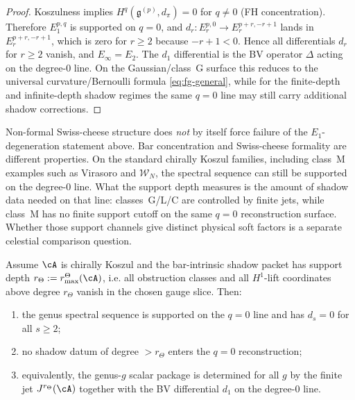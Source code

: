 \begin{proof}
Koszulness implies $H^q(\mathfrak{g}^{(p)}, d_\pi) = 0$ for $q \neq 0$
(FH concentration). Therefore $E_1^{p,q}$ is supported on $q = 0$, and
$d_r: E_r^{p,0} \to E_r^{p+r,-r+1}$ lands in $E_r^{p+r, -r+1}$, which is zero
for $r \geq 2$ because $-r + 1 < 0$. Hence all differentials $d_r$ for $r \geq 2$
vanish, and $E_\infty = E_2$. The $d_1$ differential is the BV operator $\Delta$
acting on the degree-$0$ line. On the Gaussian/class~G surface this reduces to
the universal curvature/Bernoulli formula \eqref{eq:fg-general}, while for the
finite-depth and infinite-depth shadow regimes the same $q=0$ line may still carry
additional shadow corrections.
\end{proof}

\begin{remark}
Non-formal Swiss-cheese structure does \emph{not} by itself force failure of
the $E_1$-degeneration statement above. Bar concentration and Swiss-cheese
formality are different properties. On the standard chirally Koszul families,
including class~M examples such as Virasoro and $\mathcal{W}_N$, the spectral
sequence can still be supported on the degree-$0$ line. What the support depth
measures is the amount of shadow data needed on that line: classes~G/L/C are
controlled by finite jets, while class~M has no finite support cutoff on the
same $q=0$ reconstruction surface.  Whether those support channels give
distinct physical soft factors is a separate celestial comparison question.
\end{remark}

\begin{proposition}[Finite support shadow depth controls the $q=0$ reconstruction; \ClaimStatusProvedHere]
Assume $\cA$ is chirally Koszul and the bar-intrinsic shadow packet has
support depth \(r_\Theta:=r^\Theta_{\max}(\cA)\), i.e. all obstruction
classes and all \(H^1\)-lift coordinates above degree \(r_\Theta\) vanish in the
chosen gauge slice. Then:
\begin{enumerate}[label=\textup{(\roman*)}]
\item the genus spectral sequence is supported on the $q=0$ line and has
 $d_s = 0$ for all $s \geq 2$;
\item no shadow datum of degree \(>r_\Theta\) enters the $q=0$ reconstruction;
\item equivalently, the genus-$g$ scalar package is determined for all $g$ by the
 finite jet \(J^{r_\Theta}(\cA)\) together with the BV differential $d_1$ on the
 degree-$0$ line.
\end{enumerate}
\end{proposition}

